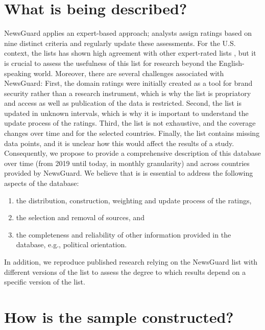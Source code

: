\documentclass[12pt]{article}
\begin{document}
\section*{What is being described?}
NewsGuard applies an expert-based approach; analysts assign ratings based on nine distinct criteria and regularly update these assessments. For the U.S. context, the lists has shown high agreement with other expert-rated lists \citep{linHighLevelCorrespondence2023}, but it is crucial to assess the usefulness of this list for research beyond the English-speaking world. Moreover, there are several challenges associated with NewsGuard: First, the domain ratings were initially created as a tool for brand security rather than a research instrument, which is why the list is propriatory and access as well as publication of the data is restricted. Second, the list is updated in unknown intervals, which is why it is important to understand the update process of the ratings. Third, the list is not exhaustive, and the coverage changes over time and for the selected countries. Finally, the list contains missing data points, and it is unclear how this would affect the results of a study.
Consequently, we propose to provide a comprehensive description of this database over time (from 2019 until today, in monthly granularity) and across countries provided by NewsGuard. We believe that is is essential to address the following aspects of the database: 
\begin{enumerate}[label= \alph*)]
\item the distribution, construction, weighting and update process of the ratings,
\item the selection and removal of sources, and 
\item the completeness and reliability of other information provided in the database, e.g., political orientation.
\end{enumerate}

In addition, we reproduce published research relying on the NewsGuard list with different versions of the list to assess the degree to which results depend on a specific version of the list.

\section*{How is the sample constructed?}
\end{document}
